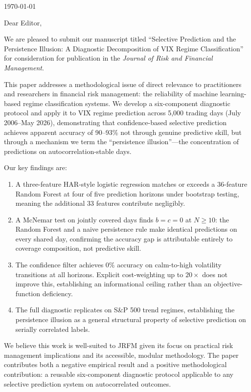 \documentclass[12pt]{article}
\begin{document}
\pagestyle{empty}

\today

\bigskip

Dear Editor,

We are pleased to submit our manuscript titled ``Selective Prediction and the Persistence Illusion: A Diagnostic Decomposition of VIX Regime Classification'' for consideration for publication in the \textit{Journal of Risk and Financial Management}.

This paper addresses a methodological issue of direct relevance to practitioners and researchers in financial risk management: the reliability of machine learning-based regime classification systems. We develop a six-component diagnostic protocol and apply it to VIX regime prediction across 5,000 trading days (July 2006--May 2026), demonstrating that confidence-based selective prediction achieves apparent accuracy of 90--93\% not through genuine predictive skill, but through a mechanism we term the ``persistence illusion''---the concentration of predictions on autocorrelation-stable days.

Our key findings are:

\begin{enumerate}
  \item A three-feature HAR-style logistic regression matches or exceeds a 36-feature Random Forest at four of five prediction horizons under bootstrap testing, meaning the additional 33 features contribute negligibly.

  \item A McNemar test on jointly covered days finds $b = c = 0$ at $N \geq 10$: the Random Forest and a naive persistence rule make identical predictions on every shared day, confirming the accuracy gap is attributable entirely to coverage composition, not predictive skill.

  \item The confidence filter achieves 0\% accuracy on calm-to-high volatility transitions at all horizons. Explicit cost-weighting up to $20\times$ does not improve this, establishing an informational ceiling rather than an objective-function deficiency.

  \item The full diagnostic replicates on S\&P 500 trend regimes, establishing the persistence illusion as a general structural property of selective prediction on serially correlated labels.
\end{enumerate}

We believe this work is well-suited to JRFM given its focus on practical risk management implications and its accessible, modular methodology. The paper contributes both a negative empirical result and a positive methodological contribution: a reusable six-component diagnostic protocol applicable to any selective prediction system on autocorrelated outcomes.
\end{document}

